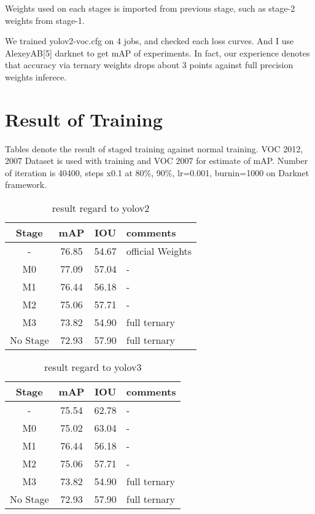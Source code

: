 \documentclass[twocolumn]{article}
\begin{document}
Weights used on each stages is imported from previous stage, such as stage-2 weights from stage-1.

We trained yolov2-voc.cfg on 4 jobs, and checked each loss curves.
And I use AlexeyAB[5] darknet to get mAP of experiments.
In fact, our experience denotes that accuracy via ternary weights drops about 3 points against full precision weights inferece.

\section{Result of Training}

Tables denote the result of staged training against normal training.
VOC 2012, 2007 Dataset is used with training and VOC 2007 for estimate of mAP.
Number of iteration is 40400, steps x0.1 at 80\%, 90\%, lr=0.001, burnin=1000 on Darknet framework.

\begin{table}[htbp]
 \centering
 \begin{tabular}{c|c|c|l}
  Stage & mAP & IOU & comments \\ \hline\hline
  -        & 76.85 & 54.67 & official Weights \\ \hline
  M0       & 77.09 & 57.04 & -                \\ \hline
  M1       & 76.44 & 56.18 & -                \\ \hline
  M2       & 75.06 & 57.71 & -                \\ \hline
  M3       & 73.82 & 54.90 & full ternary     \\ \hline\hline
  No Stage & 72.93 & 57.90 & full ternary \\ \hline
 \end{tabular}
 \caption{result regard to yolov2}
 \label{tb:yolov2}
\end{table}


\begin{table}[htbp]
 \centering
 \begin{tabular}{c|c|c|l}
  Stage & mAP & IOU & comments \\ \hline\hline
  -        & 75.54 & 62.78 & -                \\ \hline
  M0       & 75.02 & 63.04 & -                \\ \hline
  M1       & 76.44 & 56.18 & -                \\ \hline
  M2       & 75.06 & 57.71 & -                \\ \hline
  M3       & 73.82 & 54.90 & full ternary     \\ \hline\hline
  No Stage & 72.93 & 57.90 & full ternary \\ \hline
 \end{tabular}
 \caption{result regard to yolov3}
 \label{tb:yolov3}
\end{table}
\end{document}
